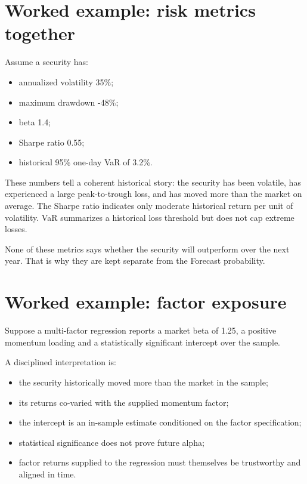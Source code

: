 \documentclass[11pt]{article}
\begin{document}
\section{Worked example: risk metrics together}
Assume a security has:
\begin{itemize}[itemsep=0.15em]
\item annualized volatility 35\%;
\item maximum drawdown -48\%;
\item beta 1.4;
\item Sharpe ratio 0.55;
\item historical 95\% one-day VaR of 3.2\%.
\end{itemize}
These numbers tell a coherent historical story: the security has been volatile, has experienced a large peak-to-trough loss, and has moved more than the market on average. The Sharpe ratio indicates only moderate historical return per unit of volatility. VaR summarizes a historical loss threshold but does not cap extreme losses.

None of these metrics says whether the security will outperform over the next year. That is why they are kept separate from the Forecast probability.

\section{Worked example: factor exposure}
Suppose a multi-factor regression reports a market beta of 1.25, a positive momentum loading and a statistically significant intercept over the sample.

A disciplined interpretation is:
\begin{itemize}[itemsep=0.15em]
\item the security historically moved more than the market in the sample;
\item its returns co-varied with the supplied momentum factor;
\item the intercept is an in-sample estimate conditioned on the factor specification;
\item statistical significance does not prove future alpha;
\item factor returns supplied to the regression must themselves be trustworthy and aligned in time.
\end{itemize}
\end{document}
